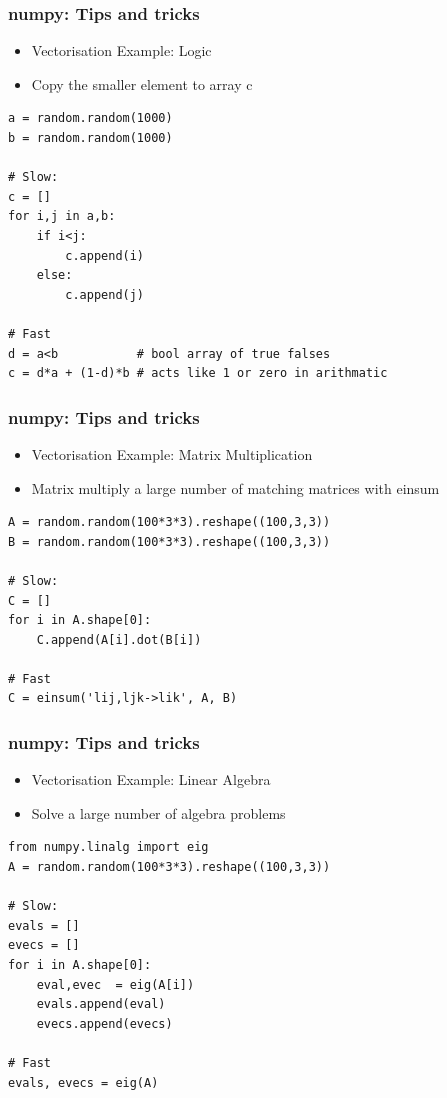 \documentclass[landscape,10pt]{beamer}
\begin{document}
\begin{frame}[fragile]
\frametitle{numpy: Tips and tricks}
\begin{itemize}
\item Vectorisation Example: Logic
\item Copy the smaller element to array c
\end{itemize}

\begin{scriptsize}
\begin{lstlisting}
a = random.random(1000)
b = random.random(1000)

# Slow:
c = []
for i,j in a,b:
    if i<j:
        c.append(i)
    else:
        c.append(j)

# Fast
d = a<b           # bool array of true falses
c = d*a + (1-d)*b # acts like 1 or zero in arithmatic
\end{lstlisting}
\end{scriptsize}

\end{frame}

\begin{frame}[fragile]
\frametitle{numpy: Tips and tricks}
\begin{itemize}
\item Vectorisation Example: Matrix Multiplication
\item Matrix multiply a large number of matching matrices with einsum
\end{itemize}

\begin{scriptsize}
\begin{lstlisting}
A = random.random(100*3*3).reshape((100,3,3))
B = random.random(100*3*3).reshape((100,3,3))

# Slow:
C = []
for i in A.shape[0]:
    C.append(A[i].dot(B[i])

# Fast
C = einsum('lij,ljk->lik', A, B)
\end{lstlisting}
\end{scriptsize}

\end{frame}

\begin{frame}[fragile]
\frametitle{numpy: Tips and tricks}
\begin{itemize}
\item Vectorisation Example: Linear Algebra
\item Solve a large number of algebra problems
\end{itemize}

\begin{scriptsize}
\begin{lstlisting}
from numpy.linalg import eig
A = random.random(100*3*3).reshape((100,3,3))

# Slow:
evals = []
evecs = []
for i in A.shape[0]:
    eval,evec  = eig(A[i])
    evals.append(eval)
    evecs.append(evecs)

# Fast
evals, evecs = eig(A)
\end{lstlisting}
\end{scriptsize}

\end{frame}
\end{document}
